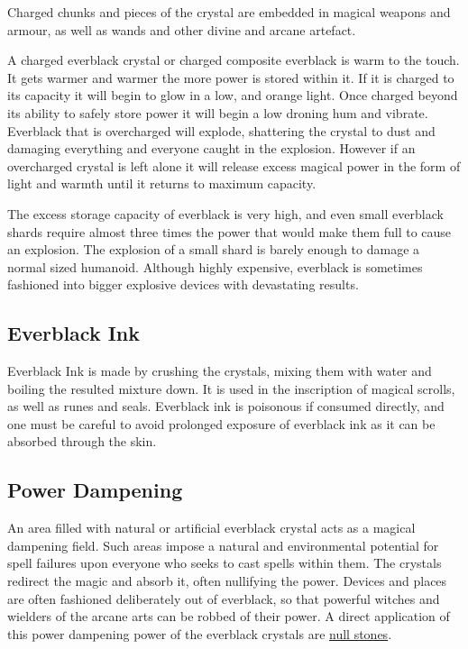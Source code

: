 Charged chunks and pieces of the crystal are embedded in magical weapons and
armour, as well as wands and other divine and arcane artefact.

A charged everblack crystal or charged composite everblack is warm to the touch.
It gets warmer and warmer the more power is stored within it. If it is charged
to its capacity it will begin to glow in a low, and orange light. Once charged
beyond its ability to safely store power it will begin a low droning hum and
vibrate. Everblack that is overcharged will explode, shattering the crystal to
dust and damaging everything and everyone caught in the explosion. However if
an overcharged crystal is left alone it will release excess magical power in
the form of light and warmth until it returns to maximum capacity.

The excess storage capacity of everblack is very high, and even small
everblack shards require almost three times the power that would make them
full to cause an explosion. The explosion of a small shard is barely enough to
damage a normal sized humanoid. Although highly expensive, everblack is
sometimes fashioned into bigger explosive devices with devastating results.


\subsection{Everblack Ink}
\label{sec:Everblack Ink}

Everblack Ink is made by crushing the crystals, mixing them with water and
boiling the resulted mixture down. It is used in the inscription of magical
scrolls, as well as runes and seals. Everblack ink is poisonous if consumed
directly, and one must be careful to avoid prolonged exposure of everblack
ink as it can be absorbed through the skin.

\subsection{Power Dampening}

An area filled with natural or artificial everblack crystal acts as a magical
dampening field. Such areas impose a natural and environmental potential for
spell failures upon everyone who seeks to cast spells within them. The
crystals redirect the magic and absorb it, often nullifying the power.
Devices and places are often fashioned deliberately out of everblack, so that
powerful witches and wielders of the arcane arts can be robbed of their power.
A direct application of this power dampening power of the everblack crystals
are \hyperref[sec:Null Stone]{null stones}.

